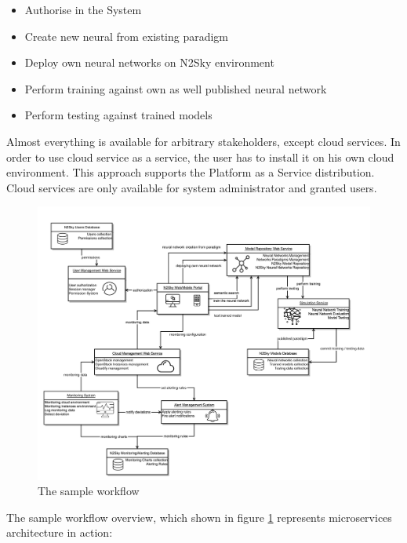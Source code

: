 \begin{itemize}
\item Authorise in the System
\item Create new neural from existing paradigm
\item Deploy own neural networks on N2Sky environment 
\item Perform training against own as well published neural network
\item Perform testing against trained models
\end{itemize}

Almost everything is available for arbitrary stakeholders, except cloud services. In order to use cloud service as a service, the user has to install it on his own cloud environment. This approach supports the Platform as a Service distribution. Cloud services are only available for system administrator and granted users. 


\begin{figure}[htbp]
\begin{center}
  \includegraphics[width=\linewidth]{components/2/new_arch.png}
  \caption{The sample workflow}
  \label{fig:newarch}
\end{center}
\end{figure}


The sample workflow overview, which shown in figure \ref{fig:newarch} represents microservices architecture in action:


